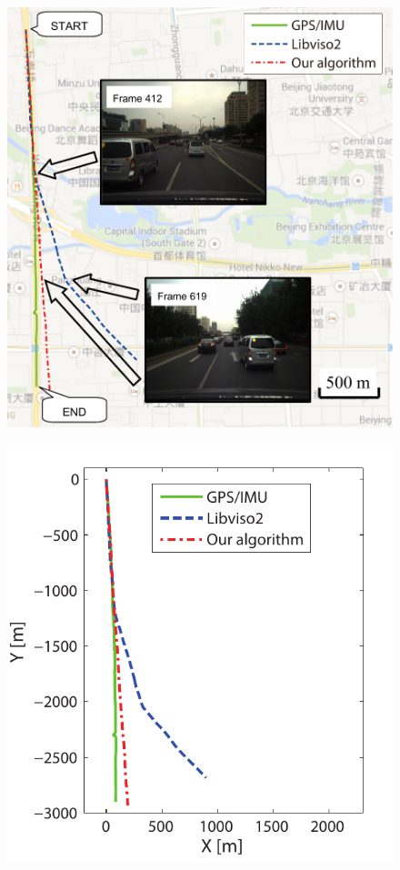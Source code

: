 \documentclass[letterpaper, 10 pt, conference]{ieeeconf}  %
\begin{document}
\begin{figure}[t]
\centering
 \begin{minipage}[t]{0.48\linewidth}
    \centering
    \includegraphics[width=1\textwidth]{source//Final//T_result_in_map_Frame200_1049.pdf}
    \label{fig:another_T_in_map}
  \end{minipage}%
  \hfill
 \begin{minipage}[t]{0.48\linewidth}
    \centering
    \includegraphics[width=1\textwidth]{source//Final//T_result_Frame200_1049.pdf}

\end{minipage}
\end{figure}
\end{document}
